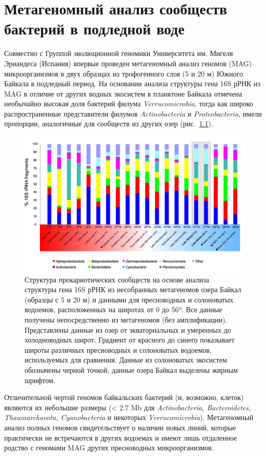 \documentclass[a4paper,12pt,openany,final]{extreport}
\def\oldcaption{} \let\oldcaption=\caption
\def\caption{\stepcounter{captionsnum}\oldcaption}
\begin{document}
\chapter{Метагеномный анализ сообществ бактерий в подледной
воде} \label{chap:3}

Совместно с Группой эволюционной геномики Университета им. Мигеля
Эрнандеса (Испания) впервые проведен метагеномный анализ геномов (MAG)
микроорганизмов в двух образцах из трофогенного слоя (5 и 20 м) Южного
Байкала в подледный период. На основании анализа структуры гена 16S рРНК
из MAG в отличие от других водных экосистем в планктоне Байкала отмечена
необычайно высокая доля бактерий филума \emph{Verrucomicrobia}, тогда
как широко распространенные представители филумов \emph{Actinobacteria}
и \emph{Proteobacteria}, имели пропорции, аналогичные для сообществ из
других озер (рис.~\ref{fig:4-3}).

\begin{figure}\centering
  \includegraphics[width=\linewidth]{media/image8.png}
  \caption{Структура прокариотических сообществ на основе анализа
структуры гена 16S рРНК из несобранных метагеномов озера Байкал (образцы
с 5 и 20 м) и данными для пресноводных и солоноватых водоемов,
расположенных на широтах от 0 до 56º. Все данные получены
непосредственно из метагеномов (без амплификации). Представлены данные
из озер от экваториальных и умеренных до холодноводных широт. Градиент
от красного до синего показывает широты различных пресноводных и
солоноватых водоемов, используемых для сравнения. Данные из солоноватых
экосистем обозначены черной точкой, данные озера Байкал выделены жирным
шрифтом.}\label{fig:4-3}
\end{figure}

Отличительной чертой геномов байкальских бактерий (и, возможно, клеток)
являются их небольшие размеры (\textless{} 2.7 Mb для
\emph{Actinobacteria, Bacteroidetes, Thaumarchaeota, Cyanobacteria} и
некоторых \emph{Verrucomicrobia}). Метагеномный анализ полных геномов
свидетельствует о наличии новых линий, которые практически не
встречаются в других водоемах и имеют лишь отдаленное родство с геномами
MAG других пресноводных микроорганизмов.
\end{document}
